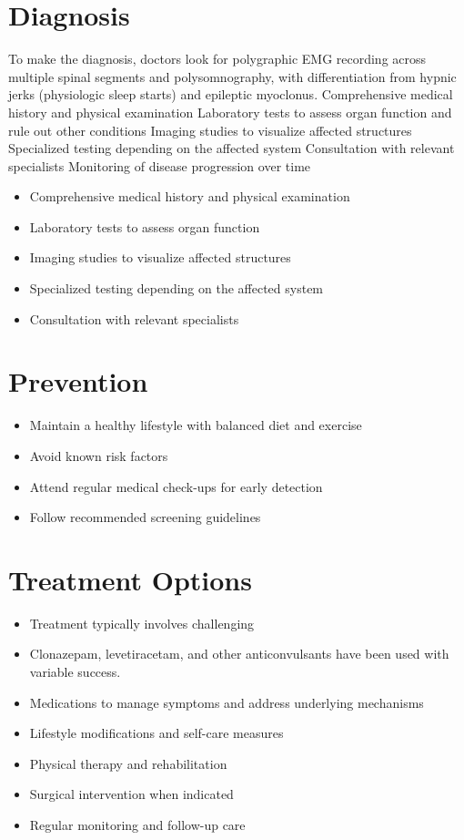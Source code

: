 \section{Diagnosis}
To make the diagnosis, doctors look for polygraphic EMG recording across multiple spinal segments and polysomnography, with differentiation from hypnic jerks (physiologic sleep starts) and epileptic myoclonus. Comprehensive medical history and physical examination Laboratory tests to assess organ function and rule out other conditions Imaging studies to visualize affected structures Specialized testing depending on the affected system Consultation with relevant specialists Monitoring of disease progression over time

\begin{itemize}[noitemsep]
  \item Comprehensive medical history and physical examination
  \item Laboratory tests to assess organ function
  \item Imaging studies to visualize affected structures
  \item Specialized testing depending on the affected system
  \item Consultation with relevant specialists
\end{itemize}
\section{Prevention}
\begin{itemize}[noitemsep]
  \item Maintain a healthy lifestyle with balanced diet and exercise
  \item Avoid known risk factors
  \item Attend regular medical check-ups for early detection
  \item Follow recommended screening guidelines
\end{itemize}
\section{Treatment Options}
\begin{itemize}[noitemsep]
  \item Treatment typically involves challenging
  \item Clonazepam, levetiracetam, and other anticonvulsants have been used with variable success.
  \item Medications to manage symptoms and address underlying mechanisms
  \item Lifestyle modifications and self-care measures
  \item Physical therapy and rehabilitation
  \item Surgical intervention when indicated
  \item Regular monitoring and follow-up care
\end{itemize}
